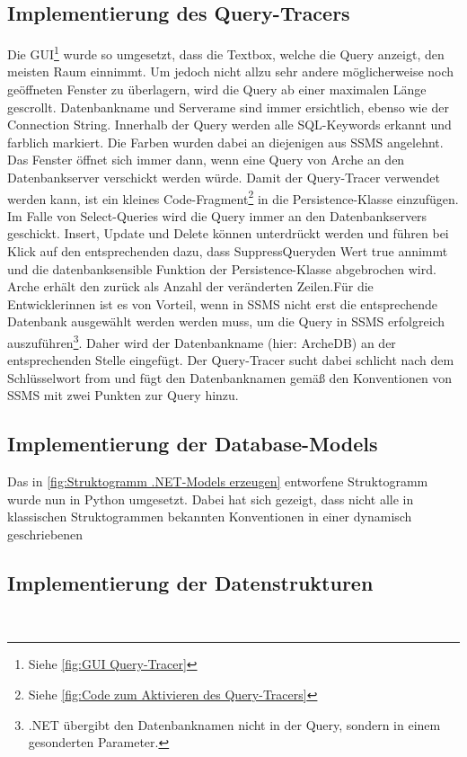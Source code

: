 \documentclass[11pt,toc=sectionentrywithoutdots, 
headheight=44pt, headings=optiontoheadandtoc, hyperfootnotes=false, hypertexnames=false]{scrartcl}
\newcommand\extendedref[1]{Siehe \ref{#1}}
\begin{document}
\subsection{Implementierung des Query-Tracers}
Die GUI\footnote{\extendedref{fig:GUI Query-Tracer}} wurde so umgesetzt, dass die Textbox, welche die Query anzeigt, den meisten Raum einnimmt. Um jedoch nicht allzu sehr andere möglicherweise noch geöffneten Fenster zu überlagern, wird die Query ab einer maximalen Länge gescrollt. Datenbankname und Serverame sind immer ersichtlich, ebenso wie der Connection String. Innerhalb der Query werden alle SQL-Keywords erkannt und farblich markiert. Die Farben wurden dabei an diejenigen aus SSMS angelehnt. Das Fenster öffnet sich immer dann, wenn eine Query von Arche an den Datenbankserver verschickt werden würde. Damit der Query-Tracer verwendet werden kann, ist ein kleines Code-Fragment\footnote{\extendedref{fig:Code zum Aktivieren des Query-Tracers}} in die Persistence-Klasse einzufügen. Im Falle von Select-Queries wird die Query immer an den Datenbankservers geschickt. Insert, Update und Delete können unterdrückt werden und führen bei Klick auf den entsprechenden dazu, dass \glqq SuppressQuery\grqq den Wert \glqq true \grqq{} annimmt und die datenbanksensible Funktion der Persistence-Klasse abgebrochen wird. Arche erhält den \grqq{} zurück als Anzahl der veränderten Zeilen.\newline\newline Für die Entwicklerinnen ist es von Vorteil, wenn in SSMS nicht erst die entsprechende Datenbank ausgewählt werden werden muss, um die Query in SSMS erfolgreich auszuführen\footnote{.NET übergibt den Datenbanknamen nicht in der Query, sondern in einem gesonderten Parameter.}. Daher wird der Datenbankname (hier: \glqq ArcheDB\grqq{}) an der entsprechenden Stelle eingefügt. Der Query-Tracer sucht dabei schlicht nach dem Schlüsselwort \glqq from\grqq{} und fügt den Datenbanknamen gemäß den Konventionen von SSMS mit zwei Punkten zur Query hinzu.

\subsection{Implementierung der Database-Models}
Das in \ref{fig:Struktogramm .NET-Models erzeugen} entworfene Struktogramm wurde nun in Python umgesetzt. Dabei hat sich gezeigt, dass nicht alle in klassischen Struktogrammen bekannten Konventionen in einer dynamisch geschriebenen

\subsection{Implementierung der Datenstrukturen}
\blindtext\
\end{document}
